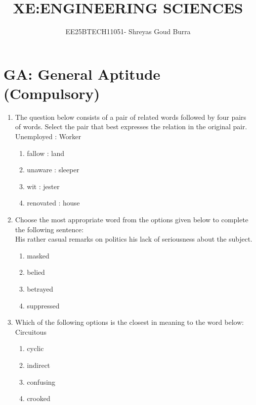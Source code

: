 \documentclass[a4paper,10pt]{article}
\title{XE:ENGINEERING SCIENCES}
\author{EE25BTECH11051- Shreyas Goud Burra}
\date{}
\begin{document}
\maketitle

\section*{GA: General Aptitude (Compulsory)}
\begin{enumerate}
\item The question below consists of a pair of related words followed by four pairs of words. Select the pair that best expresses the relation in the original pair. \\
Unemployed : Worker
\hfill{}

\begin{multicols}{2}
\begin{enumerate}
\item fallow : land
\item unaware : sleeper
\item wit : jester
\item renovated : house
\end{enumerate}
\end{multicols}

\item Choose the most appropriate word from the options given below to complete the following sentence: \\
His rather casual remarks on politics \underline{\hspace{2cm}} his lack of seriousness about the subject.
\hfill{}

\begin{multicols}{4}
\begin{enumerate}
\item masked
\item belied
\item betrayed
\item suppressed
\end{enumerate}
\end{multicols}

\item Which of the following options is the closest in meaning to the word below: \\
Circuitous
\hfill{}

\begin{multicols}{4}
\begin{enumerate}
\item cyclic
\item indirect
\item confusing
\item crooked
\end{enumerate}
\end{multicols}


\end{enumerate}
\end{document}

